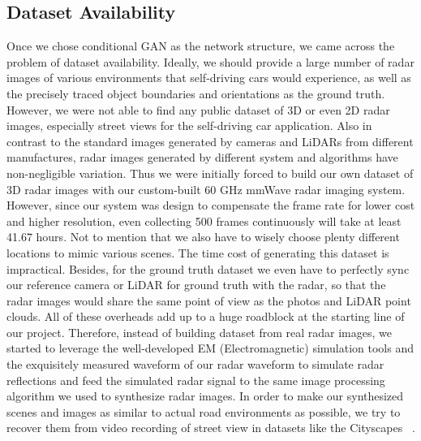 \subsection{Dataset Availability}
Once we chose conditional GAN as the network structure, we came across the problem of dataset availability. Ideally, we should provide a large number of radar images of various environments that self-driving cars would experience, as well as the precisely traced object boundaries and orientations as the ground truth. However, we were not able to find any public dataset of 3D or even 2D radar images, especially street views for the self-driving car application. Also in contrast to the standard images generated by cameras and LiDARs from different manufactures, radar images generated by different system and algorithms have non-negligible variation. Thus we were initially forced to build our own dataset of 3D radar images with our custom-built 60 GHz mmWave radar imaging system. However, since our system was design to compensate the frame rate for lower cost and higher resolution, even collecting 500 frames continuously will take at least 41.67 hours. Not to mention that we also have to wisely choose plenty different locations to mimic various scenes. The time cost of generating this dataset is impractical. Besides, for the ground truth dataset we even have to perfectly sync our reference camera or LiDAR for ground truth with the radar, so that the radar images would share the same point of view as the photos and LiDAR point clouds. All of these overheads add up to a huge roadblock at the starting line of our project. Therefore, instead of building dataset from real radar images, we started to leverage the well-developed EM (Electromagnetic) simulation tools and the exquisitely measured waveform of our radar waveform to simulate radar reflections and feed the simulated radar signal to the same image processing algorithm we used to synthesize radar images. In order to make our synthesized scenes and images as similar to actual road environments as possible, we try to recover them from video recording of street view in datasets like the Cityscapes ~\cite{cityscapes}.   

